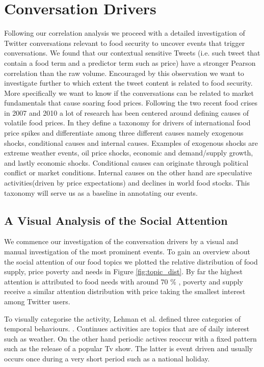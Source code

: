  \section{Conversation Drivers}
 \label{conversation}


Following our correlation analysis we proceed with a detailed investigation of Twitter conversations relevant to food security to uncover events that trigger conversations. We found that our contextual sensitive Tweets (i.e. such tweet that contain a food term and a predictor term such as price) have a stronger Pearson correlation than the raw volume. Encouraged by this observation we want to investigate further to which extent the tweet content is related to food security. More specifically we want to know if the conversations can be related to market fundamentals that cause soaring food prices. Following the two recent food crises in 2007 and 2010 a lot of research has been centered around defining causes of volatile food prices.  In \cite{Tadesse2014} they define a taxonomy for drivers of  international food price spikes and differentiate among three different causes namely exogenous shocks, conditional causes and internal causes. Examples of exogenous shocks are extreme weather events, oil price shocks, economic and demand/supply growth, and lastly economic shocks. Conditional causes can originate through political conflict or market conditions. Internal causes on the other hand are speculative activities(driven by price expectations) and declines in world food stocks. This taxonomy will serve us as a baseline in annotating our events. 



\subsection{A Visual Analysis of the Social Attention}

We commence our investigation of the conversation drivers by a visual and manual investigation of the most prominent events. To gain an overview about the social attention of our food topics we plotted the relative distribution of food supply, price poverty and needs in Figure \ref{fig:topic_dist}. By far the highest attention is attributed to food needs with around 70 \% , poverty and supply receive a similar attention distribution with price taking the smallest interest among Twitter users. 

To visually categorise the activity, Lehman et al. \cite{Lehmann2012} defined three categories of temporal behaviours. . Continues activities are topics that are of daily interest such as weather. On the other hand periodic actives reoccur with a fixed pattern such as the release of a popular Tv show. The latter is event driven and usually occurs once during a very short period such as a national holiday. 

